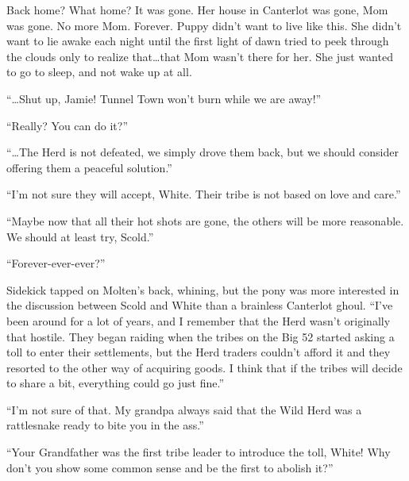 Back home? What home? It was gone. Her house in Canterlot was gone, Mom was gone. No more Mom. Forever. Puppy didn't want to live like this. She didn't want to lie awake each night until the first light of dawn tried to peek through the clouds only to realize that\dots that Mom wasn't there for her. She just wanted to go to sleep, and not wake up at all.


``\dots Shut up, Jamie! Tunnel Town won't burn while we are away!''

``Really? You can do it?''


``\dots The Herd is not defeated, we simply drove them back, but we should consider offering them a peaceful solution.''

``I'm not sure they will accept, White. Their tribe is not based on love and care.''

``Maybe now that all their hot shots are gone, the others will be more reasonable. We should at least try, Scold.''

``Forever-ever-ever?''


Sidekick tapped on Molten's back, whining, but the pony was more interested in the discussion between Scold and White than a brainless Canterlot ghoul. ``I've been around for a lot of years, and I remember that the Herd wasn't originally that hostile. They began raiding when the tribes on the Big 52 started asking a toll to enter their settlements, but the Herd traders couldn't afford it and they resorted to the other way of acquiring goods. I think that if the tribes will decide to share a bit, everything could go just fine.''

``I'm not sure of that. My grandpa always said that the Wild Herd was a rattlesnake ready to bite you in the ass.''

``Your Grandfather was the first tribe leader to introduce the toll, White! Why don't you show some common sense and be the first to abolish it?''

